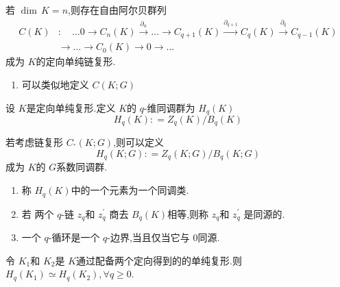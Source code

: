 \documentclass[../../几何与拓扑.tex]{subfiles}
\begin{document}
\begin{definition}
    若 \(  \operatorname{dim}\,K= n  \),则存在自由阿尔贝群列 \[
        \begin{aligned}C(K)&:\quad\ldots0\to C_n(K)\overset{\partial_n}{\operatorname*{\to}}\ldots\to C_{q+1}(K)\overset{\partial_{q+1}}{\operatorname*{\to}}C_q(K)\overset{\partial_q}{\operatorname*{\to}}C_{q-1}(K)\\&\to\ldots\to C_0(K)\to0\to\ldots\end{aligned}
    \]成为 \(  K  \)的定向单纯链复形. 
\end{definition}

\begin{remark}
    \begin{enumerate}
        \item 可以类似地定义 \(  C\left( K;G \right)   \) 
    \end{enumerate}
    
\end{remark}

\begin{definition}
    设 \(  K  \)是定向单纯复形.定义 \(  K  \)的 \(  q  \)-维同调群为 \(  H_{q}\left( K \right)   \) \[
    H_{q}\left( K \right): =  Z_{q}\left( K \right) / B_{q}\left( K \right)   
    \]    

    若考虑链复形 \(  C_{^{*}}\left( K;G \right)   \),则可以定义 \[
    H_{q}\left( K;G \right): =  Z_{q}\left( K;G \right) / B_{q}\left( K;G \right)   
    \]成为 \(  K  \)的 \(  G  \)系数同调群.   
\end{definition}

\begin{remark}
    \begin{enumerate}
        \item 称 \(  H_{q}\left( K \right)   \)中的一个元素为一个同调类. 
        \item 若 两个 \(  q  \)-链 \(  z_{q}  \)和 \(  z_{q}^{\prime}   \)  商去 \(  B_{q}\left( K \right)   \)相等,则称 \(  z_{q}  \)和 \(  z_{q}^{\prime}   \)    是同源的.
        \item 一个 \(  q  \)-循环是一个 \(  q  \)-边界,当且仅当它与 \(  0  \)同源.   
    \end{enumerate}
    
\end{remark}

\begin{theorem}
    令 \(  K_1  \)和 \(  K_2  \)是 \(  K  \)通过配备两个定向得到的的单纯复形.则 \(  H_{q}\left( K_1 \right)\simeq H_{q}\left( K_2 \right)    ,\forall  q\ge 0\).    
\end{theorem}
\end{document}
